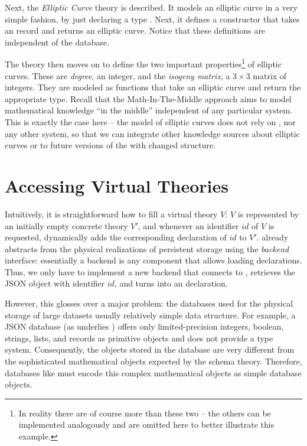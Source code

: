 

Next, the \textit{Elliptic Curve} theory is described. 
It models an elliptic curve in a very simple fashion, by just declaring a type . 
Next, it defines a  constructor that takes an \mmt record and returns an elliptic curve. 
Notice that these definitions are independent of the \lmfdb database. 

The theory then moves on to define the two important properties\footnote{In reality there
  are of course more than these two -- the others can be implemented analogously and are
  omitted here to better illustrate this example.} of elliptic curves.  These are
\textit{degree}, an integer, and the \textit{isogeny matrix}, a $3 \times 3$ matrix of
integers. They are modeled as functions that take an elliptic curve and return the
appropriate type.  Recall that the Math-In-The-Middle approach aims to model mathematical
knowledge ``in the middle'' independent of any particular system.  This is exactly the
case here -- the model of elliptic curves does not rely on \lmfdb, nor any other system,
so that we can integrate other knowledge sources about elliptic curves or to future
versions of the \lmfdb with changed structure.

\section{Accessing Virtual Theories}

Intuitively, it is straightforward how to fill a virtual theory $V$: $V$ is represented by an initially empty concrete theory $V'$, and whenever an identifier $id$ of $V$ is requested, \mmt dynamically adds the corresponding declaration of $id$ to $V'$.
\mmt already abstracts from the physical realizations of persistent storage using the \emph{backend} interface: essentially a backend is any component that allows loading declarations.
Thus, we only have to implement a new backend that connects to \lmfdb, retrieves the JSON object with identifier $id$, and turns into an \ommt declaration.

However, this glosses over a major problem: the databases used for the physical storage of large datasets usually relatively simple data structure.
For example, a JSON database (as underlies \lmfdb) offers only limited-precision integers, boolean, strings, lists, and records as primitive objects and does not provide a type system.
Consequently, the objects stored in the database are very different from the sophisticated mathematical objects expected by the schema theory.
Therefore, databases like \lmfdb must encode this complex mathematical objects as simple database objects.


